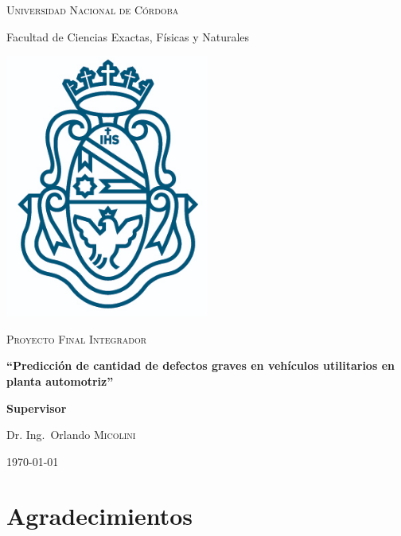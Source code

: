 \documentclass[a4paper,12pt]{article}
\author{Gerardo A. COLLANTE \\ Matrícula: 39.022.782 \\ Email: \href{mailto:gerardo.collante@unc.edu.ar}{gerardo.collante@unc.edu.ar} \\ Cel: 54 (03574) 650490}
\begin{document}
\makeatletter
\begin{titlepage}
			
	{\scshape\LARGE Universidad Nacional de Córdoba \par}
	{\Large Facultad de Ciencias Exactas, Físicas y Naturales \par}
	\vspace{0.5cm}
	\centering
	\includegraphics[width=0.5\textwidth]{unc.png}
	\par\vspace{0.5cm}
	\vspace{0.5cm}
	{\scshape\Large Proyecto Final Integrador\par}
	\vspace{1cm}
	{\large\bfseries ``Predicción de cantidad de defectos graves en vehículos utilitarios en planta automotriz'' \par}
	\vspace{1cm}
			
	\normalsize\@author\space
			
	\vspace{1cm}
	\textbf{Supervisor}\par
	Dr. Ing.~Orlando \textsc{Micolini}
		
	\vfill
		
	{\large \today\par}
\end{titlepage}

\newpage
\thispagestyle{empty}
\section*{Agradecimientos}
\vspace*{\fill}
\end{document}
